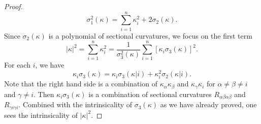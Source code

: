\documentclass[reqno]{amsart}
\theoremstyle{remark}
\theoremstyle{definition}
\numberwithin{equation}{section}
\begin{document}
\begin{proof}
    \[ \sigma_1^2(\kappa) = \sum_{i=1}^{n}\kappa_i^2 + 2\sigma_2(\kappa). \]
    Since \(\sigma_2(\kappa)\) is a polynomial of sectional curvatures, we focus on the first term
    \[ |\kappa|^2 = \sum_{i=1}^{n} \kappa_i^2 = \frac{1}{\sigma_3^2(\kappa)}\sum_{i=1}^{n}[\kappa_i \sigma_3(\kappa)]^2. \]
    For each \(i\), we have
    \[ \kappa_i \sigma_3(\kappa) = \kappa_i\sigma_3(\kappa|i) + \kappa_i^2\sigma_2(\kappa|i). \]
    Note that the right hand side is a combination of \(\kappa_\alpha\kappa_\beta\) and \(\kappa_\gamma\kappa_i\) for \(\alpha\neq \beta\neq i\) and \(\gamma\neq i\). Then \(\kappa_i \sigma_3(\kappa)\) is a combination of sectional curvatures \(R_{\alpha\beta\alpha\beta}\) and \(R_{\gamma i \gamma i}\). Combined with the intrinsicality of \(\sigma_3(\kappa)\) as we have already proved, one sees the intrinsicality of \(|\kappa|^2\). 
\end{proof}


\end{document}
